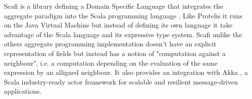 Scafi \cite{Scafi, scafiphd} is a library defining a Domain Specific Language that integrates the aggregate paradigm into the Scala programming language \cite{Scala}. Like Protelis it runs on the Java Virtual Machine but instead of defining its own language it take advantage of the Scala language and its expressive type system. Scafi unlike the others aggregate programming implementation doesn't have an explicit representation of fields but instead has a notion of "computation against a neighbour", i.e. a computation depending on the evaluation of the same expression by an alligned neighbour. It also provides an integration with Akka \cite{Akka}, a Scala industry-ready actor framework for scalable and resilient message-driven applications.
